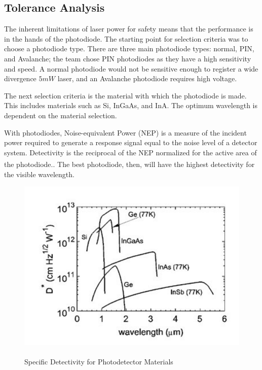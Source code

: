 \documentclass[letterpaper,10pt]{article}
\begin{document}
\begin{spacing}{1.15}
\subsection{Tolerance Analysis} \label{section-tolerance-analysis}
The inherent limitations of laser power for safety means that the performance is in the hands of the photodiode. The starting point for selection criteria was to choose a photodiode type. There are three main photodiode types: normal, PIN, and Avalanche; the team chose PIN photodiodes as they have a high sensitivity and speed. A normal photodiode would not be sensitive enough to register a wide divergence $5mW$ laser, and an Avalanche photodiode requires high voltage. 

The next selection criteria is the material with which the photodiode is made. This includes materials such as Si, InGaAs, and InA. The optimum wavelength is dependent on the material selection.

With photodiodes, Noise-equivalent Power (NEP) is a measure of the incident power required to generate a response signal equal to the noise level of a detector system. Detectivity is the reciprocal of the NEP normalized for the active area of the photodiode.\textsuperscript{\cite{Microphotonics}}. The best photodiode, then, will have the highest detectivity for the visible wavelength.  

\begin{figure} [H]
	\centering
	\includegraphics[scale=0.4]{detectivity-table.png}
	\label{fig:detectivity-table}
	\caption{Specific Detectivity for Photodetector Materials \textsuperscript{\cite{Optical}} \label{fig:detectivity-table}}
\end{figure}


\end{spacing}
\end{document}
